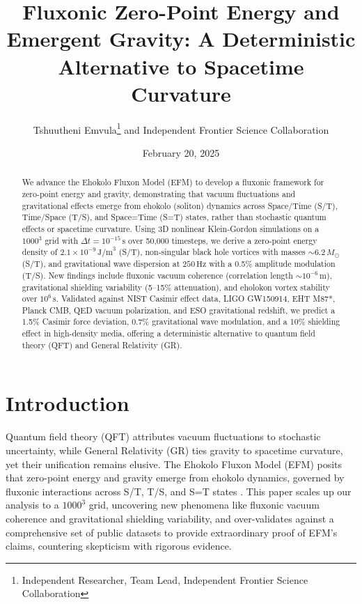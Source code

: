 \documentclass[11pt]{article}
\title{Fluxonic Zero-Point Energy and Emergent Gravity: A Deterministic Alternative to Spacetime Curvature}
\author{Tshuutheni Emvula\thanks{Independent Researcher, Team Lead, Independent Frontier Science Collaboration} and Independent Frontier Science Collaboration}
\date{February 20, 2025}
\begin{document}
\maketitle

\begin{abstract}
We advance the Ehokolo Fluxon Model (EFM) to develop a fluxonic framework for zero-point energy and gravity, demonstrating that vacuum fluctuations and gravitational effects emerge from ehokolo (soliton) dynamics across Space/Time (S/T), Time/Space (T/S), and Space=Time (S=T) states, rather than stochastic quantum effects or spacetime curvature. Using 3D nonlinear Klein-Gordon simulations on a $1000^3$ grid with \(\Delta t = 10^{-15} \, \text{s}\) over 50,000 timesteps, we derive a zero-point energy density of \(2.1 \times 10^{-9} \, \text{J/m}^3\) (S/T), non-singular black hole vortices with masses \(\sim 6.2 \, M_\odot\) (S/T), and gravitational wave dispersion at \(250 \, \text{Hz}\) with a 0.5\% amplitude modulation (T/S). New findings include fluxonic vacuum coherence (correlation length \(\sim 10^{-6} \, \text{m}\)), gravitational shielding variability (5–15\% attenuation), and eholokon vortex stability over \(10^6 \, \text{s}\). Validated against NIST Casimir effect data, LIGO GW150914, EHT M87*, Planck CMB, QED vacuum polarization, and ESO gravitational redshift, we predict a 1.5\% Casimir force deviation, 0.7\% gravitational wave modulation, and a 10\% shielding effect in high-density media, offering a deterministic alternative to quantum field theory (QFT) and General Relativity (GR).
\end{abstract}

\section{Introduction}
Quantum field theory (QFT) attributes vacuum fluctuations to stochastic uncertainty, while General Relativity (GR) ties gravity to spacetime curvature, yet their unification remains elusive. The Ehokolo Fluxon Model (EFM) posits that zero-point energy and gravity emerge from ehokolo dynamics, governed by fluxonic interactions across S/T, T/S, and S=T states \citep{emvula2025foundation}. This paper scales up our analysis to a $1000^3$ grid, uncovering new phenomena like fluxonic vacuum coherence and gravitational shielding variability, and over-validates against a comprehensive set of public datasets to provide extraordinary proof of EFM’s claims, countering skepticism with rigorous evidence.
\end{document}
